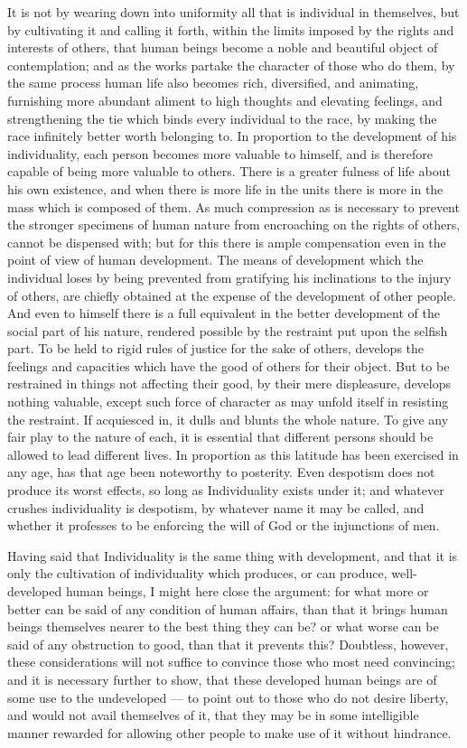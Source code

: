 \documentclass[12pt]{report}
\begin{document}
It is not by wearing down into uniformity all that is individual in themselves, but by cultivating it and calling it forth, within the limits imposed by the rights and interests of others, that human beings become a noble and beautiful object of contemplation; and as the works partake the character of those who do them, by the same process human life also becomes rich, diversified, and animating, furnishing more abundant aliment to high thoughts and elevating feelings, and strengthening the tie which binds every individual to the race, by making the race infinitely better worth belonging to. In proportion to the development of his individuality, each person becomes more valuable to himself, and is therefore capable of being more valuable to others. There is a greater fulness of life about his own existence, and when there is more life in the units there is more in the mass which is composed of them. As much compression as is necessary to prevent the stronger specimens of human nature from encroaching on the rights of others, cannot be dispensed with; but for this there is ample compensation even in the point of view of human development. The means of development which the individual loses by being prevented from gratifying his inclinations to the injury of others, are chiefly obtained at the expense of the development of other people. And even to himself there is a full equivalent in the better development of the social part of his nature, rendered possible by the restraint put upon the selfish part. To be held to rigid rules of justice for the sake of others, develops the feelings and capacities which have the good of others for their object. But to be restrained in things not affecting their good, by their mere displeasure, develops nothing valuable, except such force of character as may unfold itself in resisting the restraint. If acquiesced in, it dulls and blunts the whole nature. To give any fair play to the nature of each, it is essential that different persons should be allowed to lead different lives. In proportion as this latitude has been exercised in any age, has that age been noteworthy to posterity. Even despotism does not produce its worst effects, so long as Individuality exists under it; and whatever crushes individuality is despotism, by whatever name it may be called, and whether it professes to be enforcing the will of God or the injunctions of men.

Having said that Individuality is the same thing with development, and that it is only the cultivation of individuality which produces, or can produce, well-developed human beings, I might here close the argument: for what more or better can be said of any condition of human affairs, than that it brings human beings themselves nearer to the best thing they can be? or what worse can be said of any obstruction to good, than that it prevents this? Doubtless, however, these considerations will not suffice to convince those who most need convincing; and it is necessary further to show, that these developed human beings are of some use to the undeveloped — to point out to those who do not desire liberty, and would not avail themselves of it, that they may be in some intelligible manner rewarded for allowing other people to make use of it without hindrance.
\end{document}
